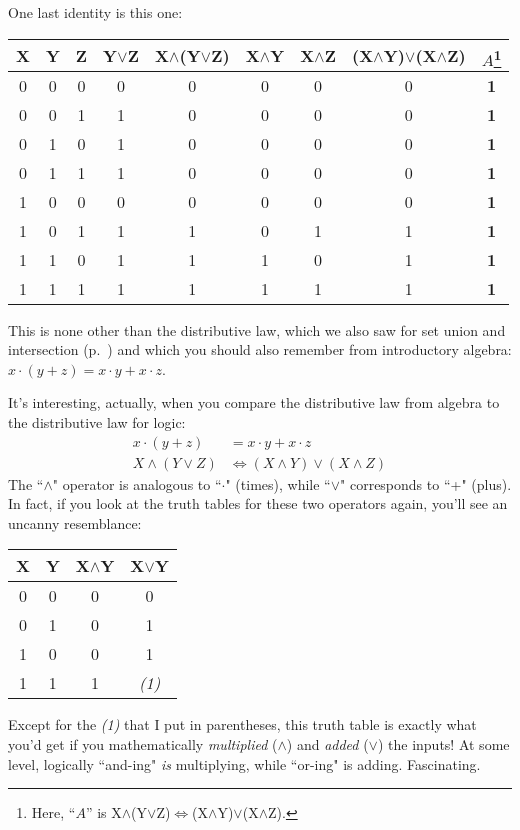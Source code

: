 One last identity is this one:
\footnotesize
{}
\begin{nobreak}
\begin{center}
\begin{tabular}{c c|c c c c c c c}
X & Y & Z & Y$\vee$Z & X$\wedge$(Y$\vee$Z) & X$\wedge$Y & X$\wedge$Z & 
(X$\wedge$Y)$\vee$(X$\wedge$Z) &
$A$\footnote{Here, ``$A$'' is
X$\wedge$(Y$\vee$Z)$\Leftrightarrow$(X$\wedge$Y)$\vee$(X$\wedge$Z).} \\
\hline
0 & 0 & 0 & 0 & 0 & 0 & 0 & 0 & \textbf{1} \\
0 & 0 & 1 & 1 & 0 & 0 & 0 & 0 & \textbf{1} \\
0 & 1 & 0 & 1 & 0 & 0 & 0 & 0 & \textbf{1} \\
0 & 1 & 1 & 1 & 0 & 0 & 0 & 0 & \textbf{1} \\
1 & 0 & 0 & 0 & 0 & 0 & 0 & 0 & \textbf{1} \\
1 & 0 & 1 & 1 & 1 & 0 & 1 & 1 & \textbf{1} \\
1 & 1 & 0 & 1 & 1 & 1 & 0 & 1 & \textbf{1} \\
1 & 1 & 1 & 1 & 1 & 1 & 1 & 1 & \textbf{1} \\
\end{tabular}
\end{center}
\end{nobreak}
\normalsize
{}
This is none other than the distributive law, which we also saw for set
union and intersection (p.~\pageref{distributivelaw}) and which you should
also remember from introductory algebra: $x\cdot(y+z)=x\cdot y+x\cdot z$.

It's interesting, actually, when you compare the distributive law from
algebra to the distributive law for logic:
\begin{align*}
x\cdot(y+z) &= x\cdot y+x\cdot z \\
X\wedge(Y\vee Z) & \Leftrightarrow(X\wedge Y)\vee(X\wedge Z)
\end{align*}
The ``$\wedge$" operator is analogous to ``$\cdot$" (times), while ``$\vee$"
corresponds to ``+" (plus). In fact, if you look at the truth tables for
these two operators again, you'll see an uncanny resemblance:
\begin{nobreak}
\begin{center}
\begin{tabular}{c c|c c}
X & Y & X$\wedge$Y & X$\vee$Y \\
\hline
0 & 0 & 0 & 0 \\
0 & 1 & 0 & 1 \\
1 & 0 & 0 & 1 \\
1 & 1 & 1 & \textit{(1)} \\
\end{tabular}
\end{center}
\end{nobreak}
Except for the \textit{(1)} that I put in parentheses, this truth table is
exactly what you'd get if you mathematically \textit{multiplied} ($\wedge$)
and \textit{added} ($\vee$) the inputs! At some level, logically ``and-ing"
\textit{is} multiplying, while ``or-ing" is adding. Fascinating.


